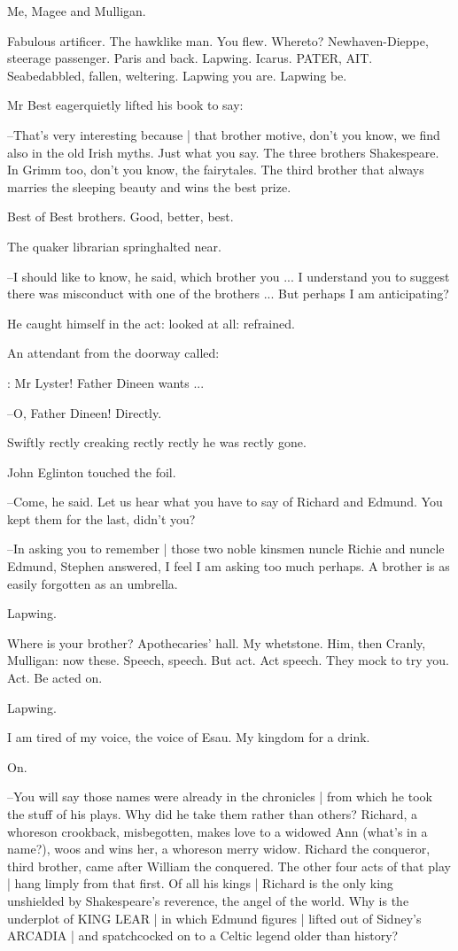 Me, Magee and Mulligan.

Fabulous artificer.
The hawklike man.
You flew.
Whereto?
Newhaven-Dieppe,
steerage passenger.
Paris and back.
Lapwing.
Icarus.
PATER, AIT.
Seabedabbled, fallen, weltering.
Lapwing you are.
Lapwing be.

Mr Best eagerquietly lifted his book to say:

--That's very interesting because |
that brother motive,
don't you know,
we find also in the old Irish myths.
Just what you say.
The three brothers Shakespeare.
In Grimm too,
don't you know,
the fairytales.
The third brother that always marries the sleeping beauty and wins the best prize.

Best of Best brothers.
Good,
better,
best.

The quaker librarian springhalted near.

--I should like to know,
he said,
which brother you ...
I understand you to suggest there was misconduct with one of the brothers ...
But perhaps I am anticipating?

He caught himself in the act:
looked at all:
refrained.

An attendant from the doorway called:

\attendant:
Mr Lyster!
Father Dineen wants ...

--O, Father Dineen!
Directly.

Swiftly rectly creaking rectly rectly he was rectly gone.

John Eglinton touched the foil.

--Come,
he said.
Let us hear what you have to say of Richard and Edmund.
You kept them for the last,
didn't you?

--In asking you to remember |
those two noble kinsmen nuncle Richie and nuncle Edmund,
Stephen answered,
I feel I am asking too much perhaps.
A brother is as easily forgotten as an umbrella.

Lapwing.

Where is your brother?
Apothecaries' hall.
My whetstone.
Him,
then Cranly,
Mulligan:
now these.
Speech,
speech.
But act.
Act speech.
They mock to try you.
Act.
Be acted on.

Lapwing.

I am tired of my voice,
the voice of Esau.
My kingdom for a drink.

On.

--You will say those names were already in the chronicles |
from which he took the stuff of his plays.
Why did he take them rather than others?
Richard,
a whoreson crookback,
misbegotten,
makes love to a widowed Ann
(what's in a name?),
woos and wins her,
a whoreson merry widow.
Richard the conqueror,
third brother,
came after William the conquered.
The other four acts of that play |
hang limply from that first.
Of all his kings |
Richard is the only king unshielded by Shakespeare's reverence,
the angel of the world.
Why is the underplot of KING LEAR |
in which Edmund figures |
lifted out of Sidney's ARCADIA |
and spatchcocked on to a Celtic legend older than history?

